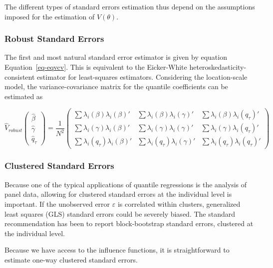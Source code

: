 \documentclass[
  authoryear,
  review,
  1p]{elsarticle}
\begin{document}
The different types of standard errors estimation thus depend on the
assumptions imposed for the estimation of \(V(\theta)\).

\subsubsection{Robust Standard Errors}\label{robust-standard-errors}

The first and most natural standard error estimator is given by equation
Equation~\ref{eq-eqvcv}. This is equivalent to the Eicker-White
heteroskedasticity-consistent estimator for least-squares estimators.
Considering the location-scale model, the variance-covariance matrix for
the quantile coefficients can be estimated as

\[\hat{V}_{robust}
  \begin{pmatrix}
  \hat\beta \\
  \hat\gamma \\
  \hat q_\tau
  \end{pmatrix}
 = \frac{1}{N^2} 
 \begin{pmatrix}
 \sum \lambda_i(\beta) \lambda_i(\beta)' & \sum \lambda_i(\beta) \lambda_i(\gamma)' & \sum \lambda_i(\beta) \lambda_i(q_\tau)' \\
 \sum \lambda_i(\gamma) \lambda_i(\beta)' & \sum \lambda_i(\gamma) \lambda_i(\gamma)' & \sum \lambda_i(\gamma) \lambda_i(q_\tau)' \\
 \sum \lambda_i(q_\tau) \lambda_i(\beta)' & \sum \lambda_i(q_\tau)\lambda_i(\gamma)' & \sum \lambda_i(q_\tau) \lambda_i(q_\tau)' 
  \end{pmatrix}
\]

\subsubsection{Clustered Standard
Errors}\label{clustered-standard-errors}

Because one of the typical applications of quantile regressions is the
analysis of panel data, allowing for clustered standard errors at the
individual level is important. If the unobserved error \(\varepsilon\)
is correlated within clusters, generalized least squares (GLS) standard
errors could be severely biased. The standard recommendation has been to
report block-bootstrap standard errors, clustered at the individual
level.

Because we have access to the influence functions, it is straightforward
to estimate one-way clustered standard errors.
\end{document}
